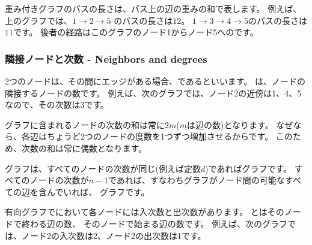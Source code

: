 重み付きグラフのパスの長さは、パス上の辺の重みの和で表します。
例えば、上のグラフでは、$1 \rightarrow 2 \rightarrow 5$ のパスの長さは$12$。
$1 \rightarrow 3 \rightarrow 4 \rightarrow 5$のパスの長さは$11$です。
後者の経路はこのグラフのノード1からノード5へのです。

\subsubsection{隣接ノードと次数 - Neighbors and degrees}



2つのノードは、その間にエッジがある場合、であるといいます。
は、ノードの隣接するノードの数です。
例えば、次のグラフでは、ノード2の近傍は1、4、5なので、その次数は3です。

\begin{center}
\end{center}

グラフに含まれるノードの次数の和は常に$2m$($m$は辺の数)となります。
なぜなら、各辺はちょうど2つのノードの度数を1つずつ増加させるからです。
このため、次数の和は常に偶数となります。


グラフは、すべてのノードの次数が同じ(例えば定数$d$)であればグラフです。
すべてのノードの次数が$n - 1$であれば、すなわちグラフがノード間の可能なすべての辺を含んでいれば、
グラフです。



有向グラフでにおいて各ノードには入次数と出次数があります。
とはそのノードで終わる辺の数、
そのノードで始まる辺の数です。
例えば、次のグラフでは、ノード2の入次数は2、ノード2の出次数は1です。

